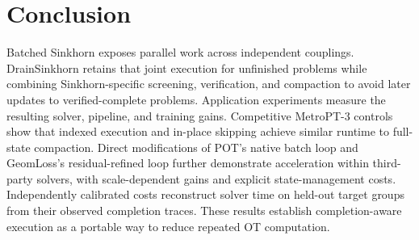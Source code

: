 \section{Conclusion}
\label{sec:conclusion}

Batched Sinkhorn exposes parallel work across independent couplings. DrainSinkhorn retains that joint execution for unfinished problems while combining Sinkhorn-specific screening, verification, and compaction to avoid later updates to verified-complete problems. Application experiments measure the resulting solver, pipeline, and training gains. Competitive MetroPT-3 controls show that indexed execution and in-place skipping achieve similar runtime to full-state compaction. Direct modifications of POT's native batch loop and GeomLoss's residual-refined loop further demonstrate acceleration within third-party solvers, with scale-dependent gains and explicit state-management costs. Independently calibrated costs reconstruct solver time on held-out target groups from their observed completion traces. These results establish completion-aware execution as a portable way to reduce repeated OT computation.
